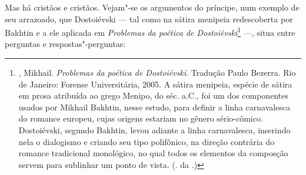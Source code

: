 Mas há cristãos e cristãos. Vejam"-se os argumentos do príncipe,
num exemplo de seu arrazoado, que Dostoiévski --- tal como na
sátira menipeia redescoberta por Bakhtin e a ele aplicada em
\emph{Problemas da poética de Dostoiévski}\footnote{, Mikhail.
\emph{Problemas da poética de Dostoiévski}. Tradução Paulo
Bezerra. Rio de Janeiro: Forense Universitária, 2005. A sátira
menipeia, espécie de sátira em prosa atribuída ao grego Menipo,
do séc.  a.C., foi um dos componentes usados por
Mikhail Bakhtin, nesse estudo, para definir a linha carnavalesca
do romance europeu, cujas origens estariam no gênero sério-cômico. Dostoiévski, segundo Bakhtin, levou adiante a linha carnavalesca, inserindo nela o dialogismo e criando seu tipo polifônico, na direção contrária do romance tradicional monológico, no qual todos os elementos da composção servem para sublinhar um ponto de vista. (. da .)} ---, situa entre perguntas e respostas"-perguntas:

